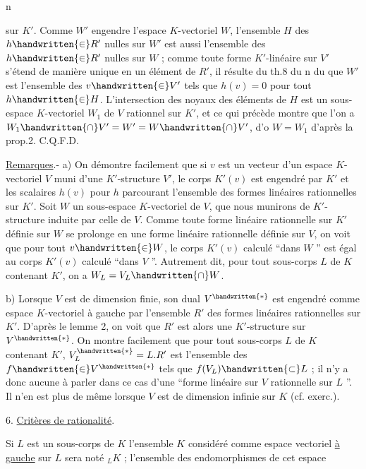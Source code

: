 \hfill n

sur $K'$. Comme $W'$ engendre l'espace $K$-vectoriel $W$, l'ensemble $H$ des $h\handwritten{\in}R'$
nulles sur $W'$ est aussi l'ensemble des $h\handwritten{\in}R'$ nulles sur $W$ ; comme toute
forme $K'$-linéaire sur $V'$ s'étend de manière unique en un élément de $R'$, il
résulte du th.8 du n du  que $W'$ est l'ensemble des $v\handwritten{\in}V'$ tels que
$h(v)=0$ pour tout $h\handwritten{\in}H$. L'intersection des noyaux des éléments de $H$ est
un sous-espace $K$-vectoriel $W_1$ de $V$ rationnel sur $K'$, et ce qui précède montre que l'on a $W_1\handwritten{\cap}V'=W'=W\handwritten{\cap}V'$, d'o $W=W_1$ d'après la prop.2. C.Q.F.D.

\uline{Remarques}.- a) On démontre facilement que si $v$ est un vecteur d'un espace
$K$-vectoriel $V$ muni d'une $K'$-structure $V'$, le corps $K'(v)$ est engendré par $K'$
et les scalaires $h(v)$ pour $h$ parcourant l'ensemble des formes linéaires
rationnelles sur $K'$. Soit $W$ un sous-espace $K$-vectoriel de $V$, que nous munirons de $K'$-structure induite par celle de $V$. Comme toute forme linéaire rationnelle sur $K'$ définie sur $W$ se prolonge en une forme linéaire rationnelle
définie sur $V$, on voit que pour tout $v\handwritten{\in}W$, le corps $K'(v)$ calculé ``dans $W$ ''
est égal au corps $K'(v)$ calculé ``dans $V$ ''. Autrement dit, pour tout sous-corps $L$ de $K$ contenant $K'$, on a $W_L=V_L\handwritten{\cap}W$.

b) Lorsque $V$ est de dimension finie, son dual $V^{\handwritten{*}}$ est engendré comme espace
$K$-vectoriel à gauche par l'ensemble $R'$ des formes linéaires rationnelles sur
$K'$. D'après le lemme 2, on voit que $R'$ est alors une $K'$-structure sur $V^{\handwritten{*}}$. On
montre facilement que pour tout sous-corps $L$ de $K$ contenant $K'$, $V_L^{\handwritten{*}}=L.R'$ est
l'ensemble des $f\handwritten{\in}V^{\handwritten{*}}$ tels que $f(V_L)\handwritten{\subset}L$ ; il n'y a donc aucune  à
parler dans ce cas d'une ``forme linéaire sur $V$ rationnelle sur $L$ ''. Il n'en
est plus de même lorsque $V$ est de dimension infinie sur $K$ (cf. exerc.\quad ).

6. \uline{Critères de rationalité}.

Si $L$ est un sous-corps de $K$ l'ensemble $K$ considéré comme espace vectoriel
\uline{à gauche} sur $L$ sera noté $ {}_L K$ ; l'ensemble des endomorphismes de cet espace
